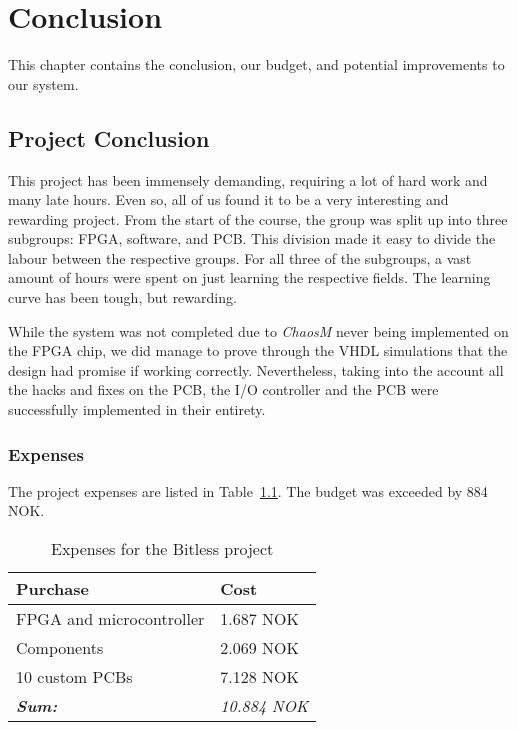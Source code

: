 
\chapter{Conclusion}

This chapter contains the conclusion, our budget, and potential improvements to our system.

\clearpage
\section{Project Conclusion}

This project has been immensely demanding, requiring a lot of hard work and many
late hours. Even so, all of us found it to be a very interesting and rewarding
project. From the start of the course, the group was split up into three
subgroups: FPGA, software, and PCB. This division made it easy to divide the
labour between the respective groups. For all three of the subgroups, a vast
amount of hours were spent on just learning the respective fields. The learning
curve has been tough, but rewarding.

While the system was not completed due to \textit{ChaosM} never being
implemented on the FPGA chip, we did manage to prove through the VHDL
simulations that the design had promise if working correctly. Nevertheless,
taking into the account all the hacks and fixes on the PCB, the I/O controller
and the PCB were successfully implemented in their entirety.

\subsection{Expenses}
The project expenses are listed in Table~\ref{tab:budget}. The budget was exceeded by 884 NOK.

\begin{table}[H]
	\centering
	\begin{tabular}{|l|l|}
		\hline
		\textbf{Purchase} & \textbf{Cost} \\
		\hline
		\hline
		FPGA and microcontroller & 1.687 NOK\\
		\hline
		Components & 2.069 NOK\\
		\hline
		10 custom PCBs & 7.128 NOK \\
		\hline
		\hline
		\textbf{\textit{Sum:}} & \textit{10.884 NOK}\\
		\hline
	\end{tabular}
	\caption{Expenses for the Bitless project}
	\label{tab:budget}
\end{table}

\clearpage


